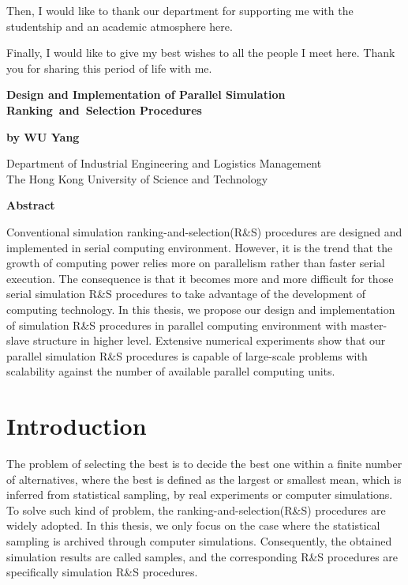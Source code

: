\documentclass[12pt,a4paper]{report}
\begin{document}
Then, I would like to thank our department for supporting me with the studentship and an academic atmosphere here.

Finally, I would like to give my best wishes to all the people I meet here. Thank you for sharing this period of life with me.

\newpage
{}
\tableofcontents
\listoffigures
\listoftables

\newpage
{}
\begin{center}
{\Large\bf Design and Implementation of Parallel Simulation Ranking~and~Selection Procedures}
\vspace{0.5cm}

{\large \bf by WU Yang}\normalsize

\medskip

Department of Industrial Engineering and Logistics Management \\
The Hong Kong University of Science and Technology

\end{center}
\vspace{1.5cm}
\centerline{{\bf \large Abstract}}
\vspace{1.5cm}

Conventional simulation ranking-and-selection(R\&S) procedures are designed and implemented in serial computing environment. However, it is the trend that the growth of computing power relies more on parallelism rather than faster serial execution. The consequence is that it becomes more and more difficult for those serial simulation R\&S procedures to take advantage of the development of computing technology. In this thesis, we propose our design and implementation of simulation R\&S procedures in parallel computing environment with master-slave structure in higher level. Extensive numerical experiments show that our parallel simulation R\&S procedures is capable of large-scale problems with scalability against the number of available parallel computing units.

\newpage
{}

\chapter{Introduction}

The problem of selecting the best is to decide the best one within a finite number of alternatives, where the best is defined as the largest or smallest mean, which is inferred from statistical sampling, by real experiments or computer simulations. To solve such kind of problem, the ranking-and-selection(R\&S) procedures are widely adopted. In this thesis, we only focus on the case where the statistical sampling is archived through computer simulations. Consequently, the obtained simulation results are called samples, and the corresponding R\&S procedures are specifically simulation R\&S procedures.
\end{document}
